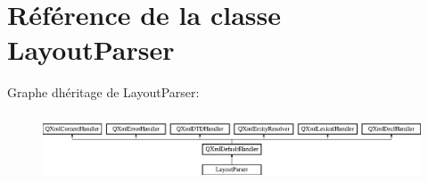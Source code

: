 \hypertarget{class_layout_parser}{}\section{Référence de la classe Layout\+Parser}
\label{class_layout_parser}
Graphe d\textquotesingle{}héritage de Layout\+Parser\+:\begin{figure}[H]
\begin{center}
\leavevmode
\includegraphics[height=2.014389cm]{class_layout_parser}
\end{center}
\end{figure}
